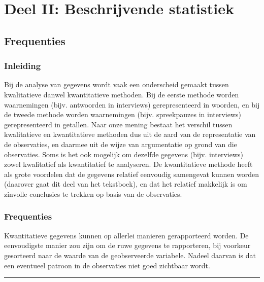 \documentclass[
]{book}
\begin{document}
\hypertarget{part-deel-ii-beschrijvende-statistiek}{%
\part*{Deel II: Beschrijvende statistiek}\label{part-deel-ii-beschrijvende-statistiek}}

\hypertarget{ch:frequenties}{%
\chapter{Frequenties}\label{ch:frequenties}}

\hypertarget{inleiding-3}{%
\section{Inleiding}\label{inleiding-3}}

Bij de analyse van gegevens wordt vaak een onderscheid gemaakt tussen
kwalitatieve danwel kwantitatieve methoden. Bij de eerste methode worden
waarnemingen (bijv. antwoorden in interviews) gerepresenteerd in
woorden, en bij de tweede methode worden waarnemingen (bijv.
spreekpauzes in interviews) gerepresenteerd in getallen. Naar onze
mening bestaat het verschil tussen kwalitatieve en kwantitatieve
methoden dus uit de aard van de representatie van de observaties, en
daarmee uit de wijze van argumentatie op grond van die observaties. Soms
is het ook mogelijk om dezelfde gegevens (bijv. interviews) zowel
kwalitatief als kwantitatief te analyseren. De kwantitatieve methode
heeft als grote voordelen dat de gegevens relatief eenvoudig samengevat
kunnen worden (daarover gaat dit deel van het tekstboek), en dat het
relatief makkelijk is om zinvolle conclusies te trekken op basis van de
observaties.

\hypertarget{sec:frequenties}{%
\section{Frequenties}\label{sec:frequenties}}

Kwantitatieve gegevens kunnen op allerlei manieren gerapporteerd worden.
De eenvoudigste manier zou zijn om de ruwe gegevens te rapporteren, bij
voorkeur gesorteerd naar de waarde van de geobserveerde variabele.
Nadeel daarvan is dat een eventueel patroon in de observaties niet goed
zichtbaar wordt.

\begin{center}\rule{0.5\linewidth}{0.5pt}\end{center}
\end{document}
